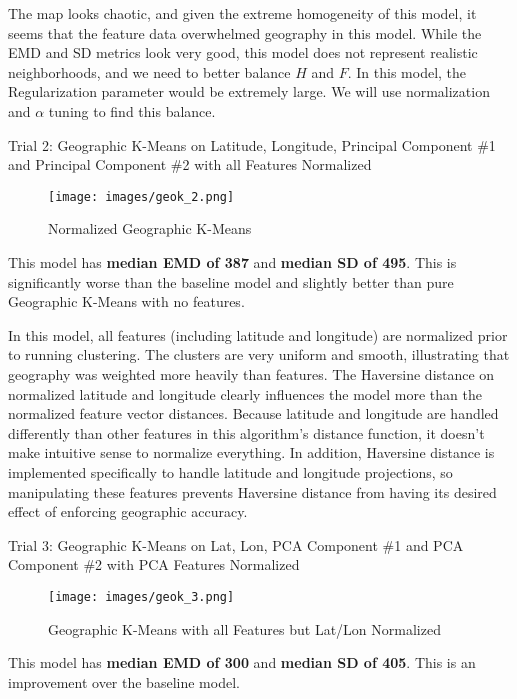 \documentclass[times new roman,12pt]{article}
\begin{document}
The map looks chaotic, and given the extreme homogeneity of this model, it seems that the feature data overwhelmed geography in this model. While the EMD and SD metrics look very good, this model does not represent realistic neighborhoods, and we need to better balance $H$ and $F$. In this model, the Regularization parameter would be extremely large. We will use normalization and $\alpha$ tuning to find this balance. 

\vspace{5mm}
\noindent
Trial 2: Geographic K-Means on Latitude, Longitude, Principal Component \#1 and Principal Component \#2 with all Features Normalized

\begin{figure}[H]
\label{geok_2}
\centering
  \texttt{[image: images/geok\_2.png]}
  \caption{Normalized Geographic K-Means}
  \label{fig:geok_2}
\end{figure}

\noindent
This model has \textbf{median EMD of 387} and \textbf{median SD of 495}. This is significantly worse than the baseline model and slightly better than pure Geographic K-Means with no features. 

In this model, all features (including latitude and longitude) are normalized prior to running clustering. The clusters are very uniform and smooth, illustrating that geography was weighted more heavily than features. The Haversine distance on normalized latitude and longitude clearly influences the model more than the normalized feature vector distances. Because latitude and longitude are handled differently than other features in this algorithm's distance function, it doesn't make intuitive sense to normalize everything. In addition, Haversine distance is implemented specifically to handle latitude and longitude projections, so manipulating these features prevents Haversine distance from having its desired effect of enforcing geographic accuracy.   

\vspace{5mm}
\noindent
Trial 3: Geographic K-Means on Lat, Lon, PCA Component \#1 and PCA Component \#2 with PCA Features Normalized

\begin{figure}[H]
\label{geok_3}
\centering
  \texttt{[image: images/geok\_3.png]}
  \caption{Geographic K-Means with all Features but Lat/Lon Normalized}
  \label{fig:geok_3}
\end{figure}

\noindent
This model has \textbf{median EMD of 300} and \textbf{median SD of 405}. This is an improvement over the baseline model. 
\end{document}
